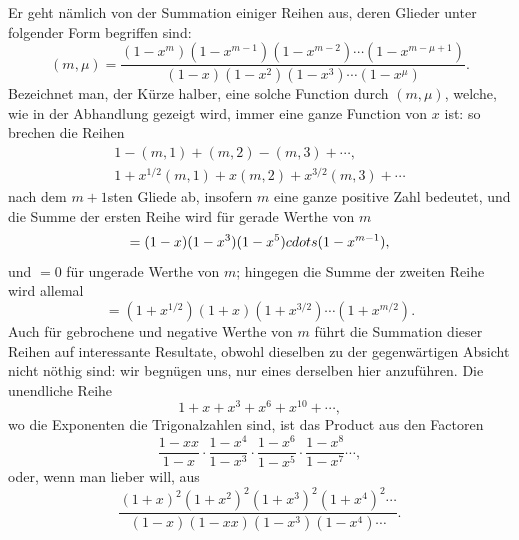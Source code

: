 \documentclass[12pt]{article}
\begin{document}
Er geht nämlich von der Summation einiger Reihen aus, deren Glieder unter folgender Form begriffen sind:
\[
(m,\mu)=\frac{(1-x^m)(1-x^{m-1})(1-x^{m-2})\cdots(1-x^{m-\mu+1})}{(1-x)(1-x^2)(1-x^3)\cdots(1-x^\mu)}.
\]
Bezeichnet man, der Kürze halber, eine solche Function durch $(m,\mu)$, welche, wie in der Abhandlung gezeigt wird, immer eine ganze Function von $x$ ist: so brechen die Reihen
\begin{align*}
1-(m,1)+(m,2)-(m,3)+\cdots,\\
1+x^{1/2}(m,1)+x(m,2)+x^{3/2}(m,3)+\cdots
\end{align*}
nach dem $m+1$sten Gliede ab, insofern $m$ eine ganze positive Zahl bedeutet, und die Summe der ersten Reihe wird für gerade Werthe von $m$
\[
=(1-x)(1-x^3)(1-x^5)\\cdots(1-x^{m-1}),
\]
und $=0$ für ungerade Werthe von $m$; hingegen die Summe der zweiten Reihe wird allemal
\[
=(1+x^{1/2})(1+x)(1+x^{3/2})\cdots(1+x^{m/2}).
\]
Auch für gebrochene und negative Werthe von $m$ führt die Summation dieser Reihen auf interessante Resultate, obwohl dieselben zu der gegenwärtigen Absicht nicht nöthig sind: wir begnügen uns, nur eines derselben hier anzuführen. Die unendliche Reihe
\[
1+x+x^3+x^6+x^{10}+\cdots,
\]
wo die Exponenten die Trigonalzahlen sind, ist das Product aus den Factoren
\[
\frac{1-xx}{1-x}\cdot\frac{1-x^4}{1-x^3}\cdot\frac{1-x^6}{1-x^5}\cdot\frac{1-x^8}{1-x^7}\cdots,
\]
oder, wenn man lieber will, aus
\[
\frac{(1+x)^2(1+x^2)^2(1+x^3)^2(1+x^4)^2\cdots}{(1-x)(1-xx)(1-x^3)(1-x^4)\cdots}.
\]
\end{document}
